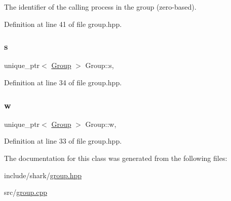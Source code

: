 The identifier of the calling process in the group (zero-\/based). 

Definition at line 41 of file group.\+hpp.

\hypertarget{classshark_1_1_group_a6c59f34c15be2873372cd006c2939da2}{}\label{classshark_1_1_group_a6c59f34c15be2873372cd006c2939da2} 
\subsubsection{\texorpdfstring{s}{s}}
{\footnotesize\ttfamily unique\+\_\+ptr$<$ \hyperlink{classshark_1_1_group}{Group} $>$ Group\+::s\hspace{0.3cm}{\ttfamily [static]}, {\ttfamily [private]}}



Definition at line 34 of file group.\+hpp.

\hypertarget{classshark_1_1_group_af542c8e71a81c12d6a73203ef9152d1f}{}\label{classshark_1_1_group_af542c8e71a81c12d6a73203ef9152d1f} 
\subsubsection{\texorpdfstring{w}{w}}
{\footnotesize\ttfamily unique\+\_\+ptr$<$ \hyperlink{classshark_1_1_group}{Group} $>$ Group\+::w\hspace{0.3cm}{\ttfamily [static]}, {\ttfamily [private]}}



Definition at line 33 of file group.\+hpp.



The documentation for this class was generated from the following files\+:\begin{DoxyCompactItemize}
\item 
include/shark/\hyperlink{group_8hpp}{group.\+hpp}\item 
src/\hyperlink{group_8cpp}{group.\+cpp}\end{DoxyCompactItemize}

